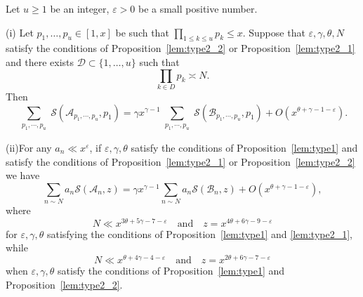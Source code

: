 \documentclass[10pt,a4paper]{amsart}
\newcommand{\cA}{\ensuremath{\mathcal{A}}}
\newcommand{\cB}{\ensuremath{\mathcal{B}}}
\newcommand{\cD}{\ensuremath{\mathcal{D}}}
\newcommand{\cS}{\ensuremath{\mathcal{S}}}
\begin{document}
\begin{lemma}\label{The Fundamental Lemma}
Let $u \geqslant 1$ be an integer, $\varepsilon > 0$ be a small positive number. 
	
(i) Let $p_1, \ldots, p_u \in [1, x]$ be such that $\prod_{1 \leqslant k \leqslant u} p_k \leqslant x$. Suppose that $\varepsilon, \gamma, \theta, N$ satisfy the conditions of Proposition~\ref{lem:type2_2} or Proposition~\ref{lem:type2_1} and there exists $\cD \subset \{1, \ldots, u\}$ such that  
$$\prod_{k \in D} p_k \asymp N.$$
Then  
\begin{equation}\label{fundamental lemma 1}
\sum_{\substack{ p_1 , \cdots , p_u  }} \cS(\cA_{p_1, \cdots, p_u}, p_1) = \gamma x^{\gamma-1} \sum_{\substack{p_1 , \cdots , p_u }} \cS(\cB_{p_1, \cdots, p_u}, p_1) + O(x^{\theta + \gamma - 1 - \varepsilon}).
\end{equation}

(ii)For any $a_n \ll x^{\varepsilon}$, if $\varepsilon, \gamma, \theta$ satisfy the conditions of Proposition~\ref{lem:type1} and satisfy the conditions of Proposition~\ref{lem:type2_1} or Proposition~\ref{lem:type2_2} we have
\begin{equation}\label{fundamental lemma 2}
\sum_{n \sim N} a_n \cS(\cA_n, z) = \gamma x^{\gamma-1} \sum_{n \sim N} a_n \cS(\cB_n, z) + O(x^{\theta + \gamma - 1 - \varepsilon} ),
\end{equation}
where 
$$
N \ll x^{3\theta + 5\gamma -7 -\varepsilon} \quad \text{and} \quad z = x^{4\theta+6\gamma-9-\varepsilon}
$$ 
for $\varepsilon, \gamma, \theta$ satisfying the conditions of Proposition~\ref{lem:type1} and \ref{lem:type2_1}, while 
$$
N \ll x^{\theta + 4\gamma -4-\varepsilon} \quad \text{and} \quad z = x^{2\theta+6\gamma-7-\varepsilon}
$$ 
when $\varepsilon, \gamma, \theta$ satisfy the conditions of Proposition~\ref{lem:type1} and Proposition~\ref{lem:type2_2}.
\end{lemma}
\end{document}

